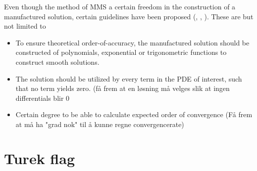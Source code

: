 Even though the method of MMS a certain freedom in the construction of a manufactured solution, certain guidelines have been proposed  (\cite{Steinberg1985}, \cite{Biggs}, \cite{Roache2002} ). These are but not limited to

\begin{itemize}
\item To ensure theoretical order-of-accuracy, the manufactured solution should be constructed of polynomials, exponential or trigonometric functions to construct smooth solutions.
\item The solution should be utilized by every term in the PDE of interest, such that no term yields zero.
(få frem at en løsning må velges slik at ingen differentials blir 0
\item Certain degree to be able to calculate expected order of convergence (Få frem at må ha "grad nok" til å kunne regne convergencerate) 
\end{itemize}



                                                                                                                                                   
\section{Turek flag}